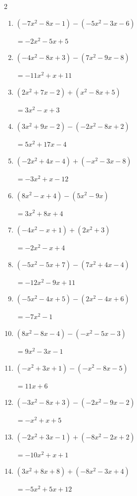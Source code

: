 \begin{multicols}{2}
\begin{enumerate}
        $=-4x+5$

  \item $(-7x^{2}-8x-1)-(-5x^{2}-3x-6)$

        $=-2x^{2}-5x+5$

  \item $(-4x^{2}-8x+3)-(7x^{2}-9x-8)$

        $=-11x^{2}+x+11$

  \item $(2x^{2}+7x-2)+(x^{2}-8x+5)$

        $=3x^{2}-x+3$

  \item $(3x^{2}+9x-2)-(-2x^{2}-8x+2)$

        $=5x^{2}+17x-4$

  \item $(-2x^{2}+4x-4)+(-x^{2}-3x-8)$

        $=-3x^{2}+x-12$

  \item $(8x^{2}-x+4)-(5x^{2}-9x)$

        $=3x^{2}+8x+4$

  \item $(-4x^{2}-x+1)+(2x^{2}+3)$

        $=-2x^{2}-x+4$

  \item $(-5x^{2}-5x+7)-(7x^{2}+4x-4)$

        $=-12x^{2}-9x+11$

  \item $(-5x^{2}-4x+5)-(2x^{2}-4x+6)$

        $=-7x^{2}-1$

  \item $(8x^{2}-8x-4)-(-x^{2}-5x-3)$

        $=9x^{2}-3x-1$

  \item $(-x^{2}+3x+1)-(-x^{2}-8x-5)$

        $=11x+6$

  \item $(-3x^{2}-8x+3)-(-2x^{2}-9x-2)$

        $=-x^{2}+x+5$

  \item $(-2x^{2}+3x-1)+(-8x^{2}-2x+2)$

        $=-10x^{2}+x+1$

  \item $(3x^{2}+8x+8)+(-8x^{2}-3x+4)$

        $=-5x^{2}+5x+12$


\end{enumerate}
\end{multicols}
